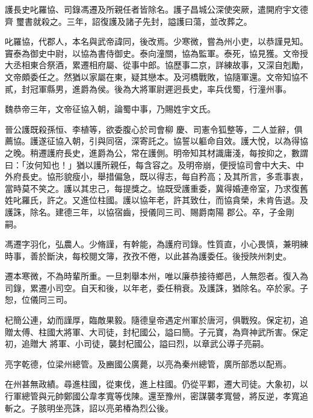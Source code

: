 \begin{pinyinscope}
 護長史叱羅協、司錄馮遷及所親任者皆除名。護子昌城公深使突厥，遣開府宇文德齊
 璽書就殺之。三年，詔復護及諸子先封，謚護曰蕩，並改葬之。



 叱羅協，代郡人，本名與武帝諱同，後改焉。少寒微，嘗為州小吏，以恭謹見知。竇泰為御史中尉，以協為書侍御史。泰向潼關，協為監軍。泰死，協見獲。文帝授大丞相東合祭酒，累遷相府屬、從事中郎。協歷事二京，詳練故事，又深自剋勵，文帝頗委任之。然猶以家屬在東，疑其戀本。及河橋戰敗，協隨軍還。文帝知協不貳，封冠軍縣男，進爵為侯。後為大將軍尉遲迥長史，率兵伐蜀，行潼州事。



 魏恭帝三年，文帝征協入朝，論蜀中事，乃賜姓宇文氏。



 晉公護既殺孫恒、李植等，欲委腹心於司會柳
 慶、司憲令狐整等，二人並辭，俱薦協。護遂征協入朝，引與同宿，深寄託之。協誓以軀命自效。護大悅，以為得協之晚。稍遷護府長史，進爵為公，常在護側。明帝知其材識庸淺，每按抑之，數謂曰：「汝何知也！」猶以護所親任，每含容之。及明帝崩，便授協司會中大夫、中外府長史。協形貌瘦小，舉措偏急，既以得志，每自矜高；及其所言，多乖事衷，當時莫不笑之。護以其忠己，每提獎之。協既受護重委，冀得婚連帝室，乃求復舊姓叱羅氏，許之。又進位柱國。護以協年老，許其致仕，而協貪榮，未肯告退。及護誅，除名。建德三年，以協宿齒，授儀同三司、賜爵南陽
 郡公。卒，子金剛嗣。



 馮遷字羽化，弘農人。少脩謹，有幹能，為護府司錄。性質直，小心畏慎，兼明練時事，善於斷決，每校閱文簿，孜孜不倦，以此甚為護委任。後授陜州刺史。



 遷本寒微，不為時輩所重。一旦刺舉本州，唯以廉恭接待鄉邑，人無怨者。復入為司錄，累遷小司空。自天和後，以年老，委任稍衰。及護誅，猶除名。卒於家。子恕，位儀同三司。



 杞簡公連，幼而謹厚，臨敵果毅。隨德皇帝遇定州軍於唐河，俱戰歿。保定初，追贈太傅、柱國大將軍、大司徒，封杞國公，謚曰簡。子元寶，為齊神武所害。保定初，追贈大
 將軍、小司徒，襲封杞國公，謚曰烈，以章武公導子亮嗣。



 亮字乾德，位梁州總管。及豳國公廣薨，以亮為秦州總管，廣所部悉以配焉。



 在州甚無政績。尋進柱國，從東伐，進上柱國。仍從平鄴，遷大司徒。大象初，以行軍總管與元帥鄭國公韋孝寬等伐陳。還至豫州，密謀襲孝寬營，將反逆，孝寬追斬之。子胲明坐亮誅，詔以亮弟椿為烈公後。




\end{pinyinscope}
